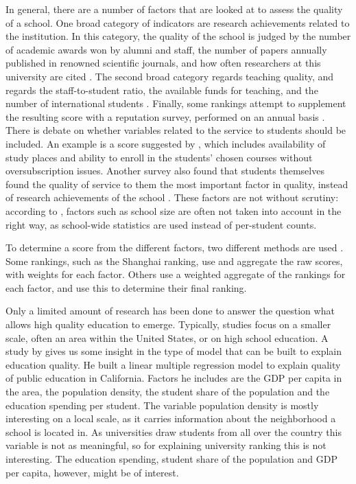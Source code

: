 \documentclass{stats_apa_style2}
\begin{document}
In general, there are a number of factors that are looked at to assess the
quality of a school. One broad category of indicators are research achievements
related to the institution. In this category, the quality of the school is
judged by the number of academic awards won by alumni and staff, the number of
papers annually published in renowned scientific journals, and how often
researchers at this university are cited \cite{shanghaidata}. The second broad
category regards teaching quality, and regards the staff-to-student ratio, the
available funds for teaching, and the number of international students
\cite{timesdata}. Finally, some rankings attempt to supplement the resulting
score with a reputation survey, performed on an annual basis \cite{timesdata}.
There is debate on whether variables related to the service to students should
be included. An example is a score suggested by ,
which includes availability of study places and ability to enroll in the
students' chosen courses without oversubscription issues. Another survey also
found that students themselves found the quality of service to them the most
important factor in quality, instead of research achievements of the school
\cite{gonzalez2006dimensions}. These factors are not without scrutiny: according
to , factors such as school size are often not taken into
account in the right way, as school-wide statistics are used instead of
per-student counts.

To determine a score from the different factors, two different methods are used
\cite{dill2005academic}. Some rankings, such as the Shanghai ranking, use and aggregate the raw scores, with
weights for each factor. Others use a weighted aggregate of the rankings for each
factor, and use this to determine their final ranking.

Only a limited amount of research has been done to answer the question what
allows high quality education to emerge. Typically, studies focus on a
smaller scale, often an area within the United States, or on high school
education.
A study by  gives us some insight in the type of model
that can be built to explain education quality. He built a linear multiple
regression model to explain quality of public education in California. Factors
he includes are the GDP per capita in the area, the population density, the
student share of the population and the education spending per student. The
variable population density is mostly interesting on a local scale, as it
carries information about the neighborhood a school is located in. As
universities draw students from all over the country this variable is not as
meaningful, so for explaining university ranking this is not interesting. The
education spending, student share of the population and GDP per capita, however,
might be of interest.
\end{document}
